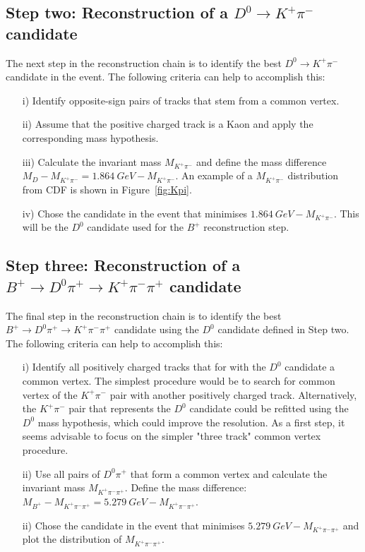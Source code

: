 \documentclass[a4paper,11pt]{article}
\begin{document}
\subsection{Step two: Reconstruction of a $D^0 \rightarrow K^+ \pi^-$ candidate}
The next step in the reconstruction chain is to identify the best $D^0 \rightarrow K^+ \pi^-$ candidate in the event. The following criteria can help to accomplish this:
\begin{itemize}
\item [i)]  Identify opposite-sign pairs of tracks that stem from a common vertex. 
\item [ii)]  Assume that the positive charged track is a Kaon and apply the corresponding mass hypothesis.
\item [iii)] Calculate the invariant mass $M_{K^+ \pi^-}$ and define the mass difference $M_{D} - M_{K^+ \pi^-} = 1.864~GeV - M_{K^+ \pi^-}$. An example of a $M_{K^+ \pi^-}$ distribution from CDF is shown in Figure~\ref{fig:Kpi}. 
\item[iv)] Chose the candidate in the event that minimises $1.864~GeV - M_{K^+ \pi^-}$. This will be the  $D^0$ candidate used for the $B^+$ reconstruction step. 
\end{itemize}

\subsection{Step three:  Reconstruction of a $B^{+} \rightarrow D^0 \pi^{+} \rightarrow K^{+}  \pi^{-} \pi^{+}$ candidate}
The final step in the reconstruction chain is to identify the best $B^{+} \rightarrow D^0 \pi^{+} \rightarrow K^{+}  \pi^{-} \pi^{+}$ candidate using the $D^0$ candidate defined in Step two.  The following criteria can help to accomplish this:
\begin{itemize}
\item [i)]  Identify all positively charged tracks that for with the $D^0$ candidate a common vertex. The simplest procedure would be to search for common vertex of the $K^{+}  \pi^{-}$ pair with another positively charged track. Alternatively, the $K^{+}  \pi^{-}$ pair that represents the $D^0$ candidate could be refitted using the $D^0$ mass hypothesis, which could improve the resolution. As a first step, it seems advisable to focus on the simpler "three track" common vertex procedure. 
\item [ii)] Use all pairs of $D^0 \pi^+$ that form a common vertex and calculate the invariant mass $M_{K^+ \pi^- \pi^+}$. Define the mass difference: $M_{B^+} - M_{K^+ \pi^- \pi^+} = 5.279~GeV - M_{K^+ \pi^- \pi^+}$.
\item [ii)] Chose the candidate in the event that minimises $ 5.279~GeV - M_{K^+ \pi^- \pi^+}$ and plot the distribution of $M_{K^+ \pi^- \pi^+}$.
\end{itemize}
\end{document}
